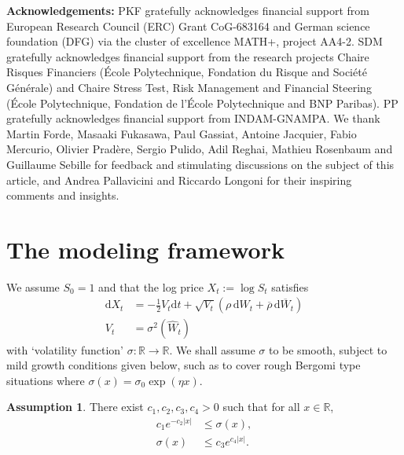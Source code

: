 \documentclass[11pt]{article}
\theoremstyle{plain}
\theoremstyle{definition}
\newtheorem{assumption}[theorem]{Assumption}
\theoremstyle{remark}
\newcommand{\R}{\mathbb{R}}
\renewcommand{\bar}{\overline}
\renewcommand{\hat}{\widehat}
\newcommand{\dd}{\mathrm{d}}
\newcommand{\1}{\mathbf{1}}
\numberwithin{equation}{section}
\begin{document}
\medskip

{\bf Acknowledgements:} PKF gratefully acknowledges financial support from European Research Council (ERC) Grant CoG-683164 and German science foundation (DFG) via the cluster of excellence MATH+, project AA4-2.
SDM gratefully acknowledges financial support from the research projects Chaire Risques Financiers (\'{E}cole Polytechnique, Fondation du Risque and Soci\'{e}t\'{e} G\'{e}n\'{e}rale) and Chaire Stress Test, Risk Management and Financial Steering (\'{E}cole Polytechnique, Fondation de l'\'{E}cole Polytechnique and BNP Paribas). PP gratefully acknowledges financial support from INDAM-GNAMPA.
We thank Martin Forde, Masaaki Fukasawa, Paul Gassiat, Antoine Jacquier, Fabio Mercurio, Olivier Prad\`ere, Sergio Pulido, Adil Reghai, Mathieu Rosenbaum and Guillaume Sebille for feedback and stimulating discussions on the subject of this article, and Andrea Pallavicini and Riccardo Longoni for their inspiring comments and insights.


\section{The modeling framework}\label{sec:modeling_framework}
\noindent We assume $S_0=1$ and that the log price $X_t := \log S_t$ satisfies
\begin{equation}\label{eq:rvol:model}
\begin{split}
\dd X_t & = -\frac12 V_t  \dd t + \sqrt{V_t} \left( \rho \, \dd W_t  + \bar{\rho} \, \dd \bar{W}_t \right)
\\
V_t &= \sigma^2(\hat{W}_t)
\end{split}
\end{equation}
with `volatility function' $\sigma: \R \to \R$. We shall assume $\sigma$ to be smooth, subject to mild growth conditions
given below, such as to cover rough Bergomi type situations where $\sigma (x) = \sigma_0 \exp (\eta x)$.


\begin{assumption}\label{assu:sigma}
	There exist $c_1,c_2,c_3,c_4 > 0$ such that for all $x\in \R$,
	\begin{align}
		c_1 e^{- c_2 |x|} &\leq \sigma( x ), \label{eq:C1}
		\\
		\sigma(x) &\leq c_3 e^{ c_4 |x|}. \label{eq:C2}
	\end{align}
\end{assumption}
\end{document}
